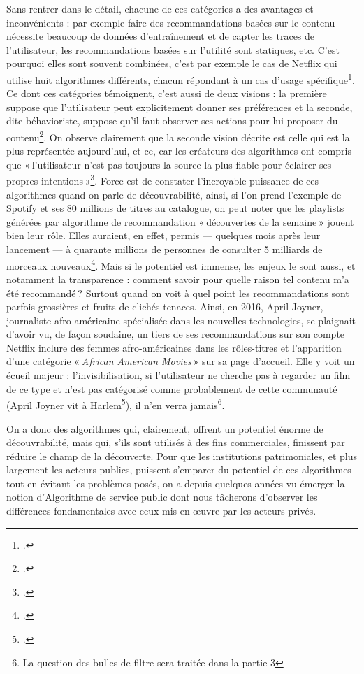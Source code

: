 Sans rentrer dans le détail, chacune de ces catégories a des avantages et inconvénients : par exemple faire des recommandations basées sur le contenu nécessite beaucoup de données d’entraînement et de capter les traces de l’utilisateur, les recommandations basées sur l’utilité sont statiques, etc. C’est pourquoi elles sont souvent combinées, c’est par exemple le cas de Netflix qui utilise huit algorithmes différents, chacun répondant à un cas d’usage spécifique\footcite[p. 47]{claes2022}. Ce dont ces catégories témoignent, c’est aussi de deux visions : la première suppose que l’utilisateur peut explicitement donner ses préférences et la seconde, dite béhavioriste, suppose qu’il faut observer ses actions pour lui proposer du contenu\footcite[p. 38]{claes2022}. On observe clairement que la seconde vision décrite est celle qui est la plus représentée aujourd’hui, et ce, car les créateurs des algorithmes ont compris que « l’utilisateur n’est pas toujours la source la plus fiable pour éclairer ses propres intentions »\footcite[p. 39]{claes2022}. Force est de constater l’incroyable puissance de ces algorithmes quand on parle de découvrabilité, ainsi, si l’on prend l’exemple de Spotify et ses 80 millions de titres au catalogue, on peut noter que les playlists générées par algorithme de recommandation « découvertes de la semaine » jouent bien leur rôle. Elles auraient, en effet, permis — quelques mois après leur lancement — à quarante millions de personnes de consulter 5 milliards de morceaux nouveaux\footcite[§ 2]{durand_chapitre_2016-1}. Mais si le potentiel est immense, les enjeux le sont aussi, et notamment la transparence : comment savoir pour quelle raison tel contenu m’a été recommandé ? Surtout quand on voit à quel point les recommandations sont parfois grossières et fruits de clichés tenaces. Ainsi, en 2016, April Joyner, journaliste afro-américaine spécialisée dans les nouvelles technologies, se plaignait d’avoir vu, de façon soudaine, un tiers de ses recommandations sur son compte Netflix inclure des femmes afro-américaines dans les rôles-titres et l’apparition d’une catégorie « \textit{African American Movies} » sur sa page d’accueil. Elle y voit un écueil majeur : l’invisibilisation, si l’utilisateur ne cherche pas à regarder un film de ce type et n’est pas catégorisé comme probablement de cette communauté (April Joyner vit à Harlem\footcite{2017}), il n’en verra jamais\footnote{La question des bulles de filtre sera traitée dans la partie 3}.

On a donc des algorithmes qui, clairement, offrent un potentiel énorme de découvrabilité, mais qui, s’ils sont utilisés à des fins commerciales, finissent par réduire le champ de la découverte. Pour que les institutions patrimoniales, et plus largement les acteurs publics, puissent s’emparer du potentiel de ces algorithmes tout en évitant les problèmes posés, on a depuis quelques années vu émerger la notion d’Algorithme de service public dont nous tâcherons d’observer les différences fondamentales avec ceux mis en œuvre par les acteurs privés.



